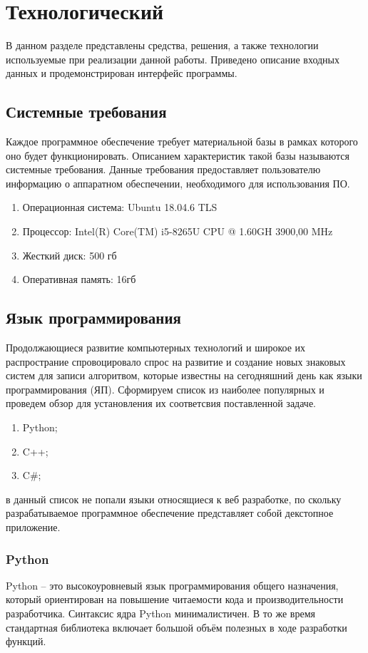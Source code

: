 \section{Технологический}
В данном разделе представлены средства, решения, а также технологии используемые при реализации данной работы.
Приведено описание входных данных и продемонстрирован интерфейс программы.

\subsection{Системные требования}
Каждое программное обеспечение требует материальной базы в рамках которого оно будет функционировать.
Описанием характеристик такой базы называются системные требования.
Данные требования предоставляет пользователю информацию о аппаратном обеспечении, необходимого для использования ПО.
\begin{enumerate}
	\item Операционная система: Ubuntu 18.04.6 TLS
	\item Процессор: Intel(R) Core(TM) i5-8265U CPU @ 1.60GH	3900,00 MHz	
	\item Жесткий диск: 500 гб
	\item Оперативная память: 16гб
\end{enumerate}

\subsection{Язык программирования}
Продолжающиеся развитие компьютерных технологий и широкое их распространие спровоцировало спрос на развитие и создание новых знаковых систем для записи алгоритвом, которые известны на сегодняшний день как языки программирования (ЯП).
Сформируем список из наиболее популярных и проведем обзор для установления их соответсвия поставленной задаче.
\begin{enumerate}
	\item Python;
	\item C++;
	\item C\#;
\end{enumerate}
в данный список не попали языки относящиеся к веб разработке, по скольку разрабатываемое программное обеспечение представляет собой декстопное приложение.
	
\subsubsection{Python}
Python –  это высокоуровневый язык программирования общего назначения, который ориентирован на повышение читаемости кода и производительности разработчика. 
Синтаксис ядра Python минималистичен. 
В то же время стандартная библиотека включает большой объём полезных в ходе разработки функций.

